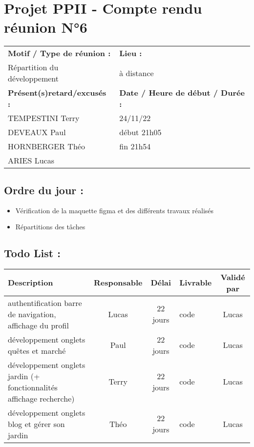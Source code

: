 \documentclass{article}
\begin{document}
\section*{Projet PPII - Compte rendu réunion N°6}
\begin{tabular}{|p{7cm}|p{6cm}|}
    \hline
    \textbf{Motif / Type de réunion :}
    & \textbf{Lieu :}
    \\
    Répartition du développement 
    & 
    à distance
    \\ \hline
    \textbf{Présent(s)retard/excusés :}
    &
    \textbf{Date / Heure de début / Durée :}
    \\ 
    TEMPESTINI Terry &  24/11/22\\  
    DEVEAUX Paul & début 21h05\\
    HORNBERGER Théo & fin 21h54\\
    ARIES Lucas & 
    \\ \hline
\end{tabular}

\subsection*{Ordre du jour :}
\begin{itemize}
    \item{Vérification de la maquette figma et des différents travaux réalisés}
    \item{Répartitions des tâches}
\end{itemize}

\subsection*{Todo List :}
\begin{tabular}{|p{3.5cm}|c|c|p{4.5cm}|c|}
    \hline 
    Description & Responsable & Délai & Livrable & Validé par 
    \\ \hline
    authentification barre de navigation, affichage du profil & Lucas & 22 jours & code & Lucas
    \\ \hline
        développement onglets quêtes et marché & Paul & 22 jours & code & Lucas
    \\ \hline
        développement onglets jardin (+ fonctionnalités affichage recherche) & Terry & 22 jours & code & Lucas
    \\ \hline
        développement onglets blog et gérer son jardin  & Théo  & 22 jours & code & Lucas
    \\ \hline
\end{tabular}
\end{document}
